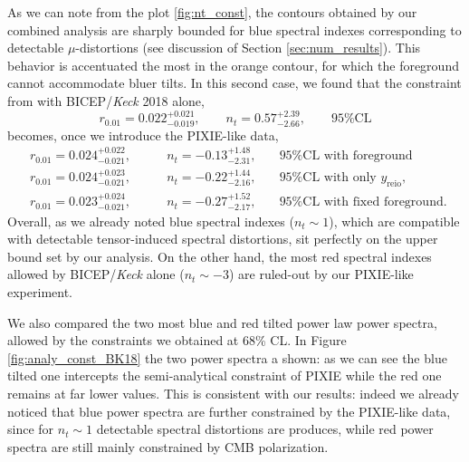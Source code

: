  As we can note from the plot \ref{fig:nt_const}, the contours obtained by our combined analysis are sharply bounded for blue spectral indexes corresponding to detectable $\mu$-distortions (see discussion of Section \ref{sec:num_results}). This behavior is accentuated the most in the orange contour, for which the foreground cannot accommodate bluer tilts.   In this second case, we found that the constraint from with BICEP/\emph{Keck} 2018 alone,
$$r_{0.01}=0.022^{+0.021}_{-0.019} ,\qquad n_t=0.57^{+2.39}_{-2.66},\qquad \text{95\%CL}$$
becomes, once we introduce the PIXIE-like data,
\begin{align*}
    &r_{0.01}=0.024^{+0.022}_{-0.021} ,\qquad &n_t=-0.13^{+1.48}_{-2.31},\quad &\text{95\%CL with foreground }\\
    &r_{0.01}=0.024^{+0.023}_{-0.021} ,\qquad &n_t=-0.22^{+1.44}_{-2.16},\quad &\text{95\%CL with only }y_\text{reio},\\
    &r_{0.01}=0.023^{+0.024}_{-0.021} ,\qquad &n_t=-0.27^{+1.52}_{-2.17},\quad &\text{95\%CL with fixed foreground. }
\end{align*}
 Overall, as we already noted blue spectral indexes ($n_t\sim1$), which are compatible with detectable tensor-induced spectral distortions, sit perfectly on the upper bound set by our analysis. On the other hand, the most red spectral indexes allowed by BICEP/\emph{Keck} alone ($n_t\sim-3$) are ruled-out by our PIXIE-like experiment.

We also compared the two most blue and red tilted power law power spectra, allowed by the constraints we obtained at 68\% CL. In Figure \ref{fig:analy_const_BK18} the two power spectra a shown: as we can see the blue tilted one intercepts the semi-analytical constraint of PIXIE while the red one remains at far lower values. This is consistent with our results: indeed we already noticed that blue power spectra are further constrained by the PIXIE-like data, since for $n_t\sim1$ detectable spectral distortions are produces, while red power spectra are still mainly constrained by CMB polarization.

